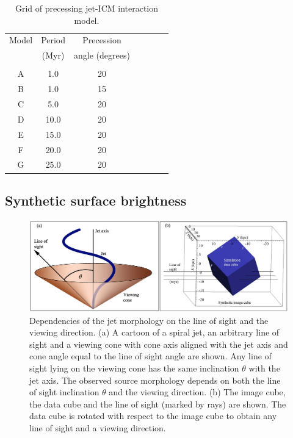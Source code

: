 %
%
\begin{table}
\centering
\caption{Grid of precessing jet-ICM interaction model. }
\begin{tabular}{*{7}{c}}
\hline \hline
Model &   Period & Precession   \\
      & (Myr)  & angle (degrees) \\ 
 \\ \hline
   A & 1.0 & 20 \\
   B & 1.0 & 15  \\
   C & 5.0  & 20  \\
   D & 10.0 & 20 \\
   E & 15.0 & 20 \\
   F & 20.0 & 20 \\
   G & 25.0 & 20 \\
\hline
\end{tabular}
\label{t:mod}
\end{table}

%
%
\subsection{Synthetic surface brightness}
\begin{figure}
\centering
\includegraphics[width=\textwidth]{fig3.eps}
\caption{Dependencies of the jet morphology on the line of sight and the viewing direction. (a) A cartoon of a spiral jet, an arbitrary line of sight and a viewing cone with cone axis aligned with the jet axis and cone angle equal to the line of sight angle are shown. Any line of sight lying on the viewing cone has the same inclination $\theta$ with the jet axis. The observed source morphology depends on both the line of sight inclination $\theta$ and the viewing direction. (b) The image cube, the data cube and the line of sight (marked by rays) are shown. The data cube is rotated with respect to the image cube to obtain any line of sight and a viewing direction.}
\label{f:con}
\end{figure}

